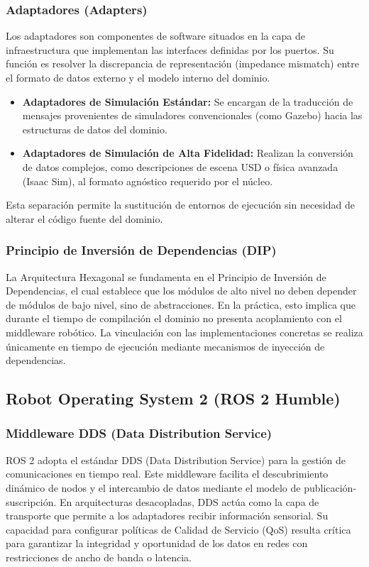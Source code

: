 \subsubsection{Adaptadores (Adapters)}
Los adaptadores son componentes de software situados en la capa de infraestructura que implementan las interfaces definidas por los puertos. Su función es resolver la discrepancia de representación (impedance mismatch) entre el formato de datos externo y el modelo interno del dominio.
\begin{itemize}
    \item \textbf{Adaptadores de Simulación Estándar:} Se encargan de la traducción de mensajes provenientes de simuladores convencionales (como Gazebo) hacia las estructuras de datos del dominio.
    \item \textbf{Adaptadores de Simulación de Alta Fidelidad:} Realizan la conversión de datos complejos, como descripciones de escena USD o física avanzada (Isaac Sim), al formato agnóstico requerido por el núcleo.
\end{itemize}
Esta separación permite la sustitución de entornos de ejecución sin necesidad de alterar el código fuente del dominio.

\subsubsection{Principio de Inversión de Dependencias (DIP)}
La Arquitectura Hexagonal se fundamenta en el Principio de Inversión de Dependencias, el cual establece que los módulos de alto nivel no deben depender de módulos de bajo nivel, sino de abstracciones. En la práctica, esto implica que durante el tiempo de compilación el dominio no presenta acoplamiento con el middleware robótico. La vinculación con las implementaciones concretas se realiza únicamente en tiempo de ejecución mediante mecanismos de inyección de dependencias.

\subsection{Robot Operating System 2 (ROS 2 Humble)}

\subsubsection{Middleware DDS (Data Distribution Service)}
ROS 2 adopta el estándar DDS (Data Distribution Service) para la gestión de comunicaciones en tiempo real. Este middleware facilita el descubrimiento dinámico de nodos y el intercambio de datos mediante el modelo de publicación-suscripción. En arquitecturas desacopladas, DDS actúa como la capa de transporte que permite a los adaptadores recibir información sensorial. Su capacidad para configurar políticas de Calidad de Servicio (QoS) resulta crítica para garantizar la integridad y oportunidad de los datos en redes con restricciones de ancho de banda o latencia.

